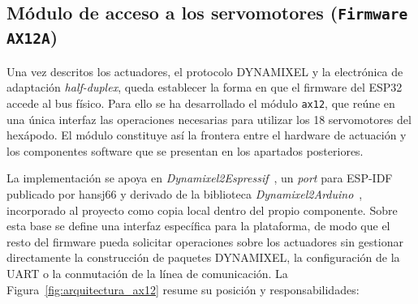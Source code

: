 \newpage
\subsection{Módulo de acceso a los servomotores (\texttt{Firmware AX12A})}
\label{subsec:driver_ax12}

Una vez descritos los actuadores, el protocolo DYNAMIXEL y la electrónica de
adaptación \textit{half-duplex}, queda establecer la forma en que el firmware
del ESP32 accede al bus físico. Para ello se ha desarrollado el módulo
\texttt{ax12}, que reúne en una única interfaz las operaciones necesarias para
utilizar los 18 servomotores del hexápodo. El módulo constituye así la frontera
entre el hardware de actuación y los componentes software que se presentan en
los apartados posteriores.

La implementación se apoya en
\textit{Dynamixel2Espressif}~\cite{dynamixel2espressif}, un \textit{port} para
ESP-IDF publicado por hansj66 y derivado de la biblioteca
\textit{Dynamixel2Arduino}~\cite{dynamixel2arduino}, incorporado al proyecto
como copia local dentro del propio componente. Sobre esta base se define una
interfaz específica para la plataforma, de modo que el resto del firmware pueda
solicitar operaciones sobre los actuadores sin gestionar directamente la
construcción de paquetes DYNAMIXEL,  la configuración de la UART o la
conmutación de la línea de comunicación. La Figura~\ref{fig:arquitectura_ax12} resume su posición y responsabilidades:


